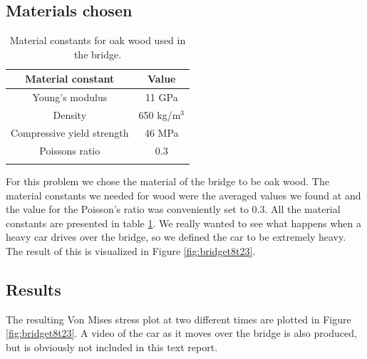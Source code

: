 \subsection{Materials chosen}
\begin{table}
\center
\caption{Material constants for oak wood used in the bridge.} 
\begin{tabular}{cc}
Material constant & Value \\ 
\hline \noalign{\smallskip}
Young's modulus & 11 GPa \\ 
Density & 650 kg/m$^3$ \\ 
Compressive yield strength & 46 MPa \\ 
Poissons ratio & 0.3 \\ 
\label{tab:oak}
\end{tabular}
\end{table}


For this problem we chose the material of the bridge to be oak wood.  The material constants we needed for wood were the averaged values we found at \cite{oak} and the value for the Poisson's ratio was conveniently set to 0.3. All the material constants are presented in table \ref{tab:oak}. We really wanted to see what happens when a heavy car drives over the bridge, so we defined the car to be extremely heavy. The result of this is visualized in Figure \ref{fig:bridget8t23}.

\subsection{Results}
The resulting Von Mises stress plot at two different times are plotted in Figure \ref{fig:bridget8t23}. A video of the car as it moves over the bridge is also produced, but is obviously not included in this text report.

